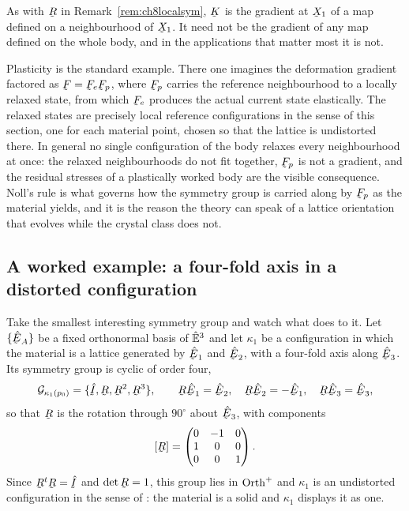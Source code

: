 \begin{remark}\label{rem:ch8Klocal}
As with $\bR$ in Remark~\ref{rem:ch8localsym}, $\bK$ is the gradient at
$\bX_{1}$ of a map defined on a neighbourhood of $\bX_{1}$. It need not
be the gradient of any map defined on the whole body, and in the
applications that matter most it is not.

Plasticity is the standard example. There one imagines the deformation
gradient factored as $\bF=\bF_{e}\bF_{p}$, where $\bF_{p}$ carries the
reference neighbourhood to a locally relaxed state, from which $\bF_{e}$
produces the actual current state elastically. The relaxed states are
precisely local reference configurations in the sense of this section,
one for each material point, chosen so that the lattice is undistorted
there. In general no single configuration of the body relaxes every
neighbourhood at once: the relaxed neighbourhoods do not fit together,
$\bF_{p}$ is not a gradient, and the residual stresses of a plastically
worked body are the visible consequence. Noll's rule is what governs how
the symmetry group is carried along by $\bF_{p}$ as the material yields,
and it is the reason the theory can speak of a lattice orientation that
evolves while the crystal class does not.
\end{remark}

\subsection*{A worked example: a four-fold axis in a distorted
configuration}

Take the smallest interesting symmetry group and watch what 
does to it. Let $\{\hbE_{A}\}$ be a fixed orthonormal basis of $\hat{\mathbb{E}}^{3}$
and let $\kappa_{1}$ be a configuration in which the material is a
lattice generated by $\hbE_{1}$ and $\hbE_{2}$, with a four-fold axis
along $\hbE_{3}$. Its symmetry group is cyclic of order four,
\[
   \mathcal{G}_{\kappa_{1}(p_{0})}
   =\{\hI,\bR,\bR^{2},\bR^{3}\},
   \qquad
   \bR\hbE_{1}=\hbE_{2},\quad
   \bR\hbE_{2}=-\hbE_{1},\quad
   \bR\hbE_{3}=\hbE_{3},
\]
so that $\bR$ is the rotation through $90^{\circ}$ about $\hbE_{3}$,
with components
\[
   [\bR]=\begin{pmatrix}0&-1&0\\ 1&0&0\\ 0&0&1\end{pmatrix}.
\]
Since $\bR^{t}\bR=\hI$ and $\det\bR=1$, this group lies in $\operatorname{Orth}^{+}$
and $\kappa_{1}$ is an undistorted configuration in the sense of
: the material is a solid and $\kappa_{1}$ displays it as one.

